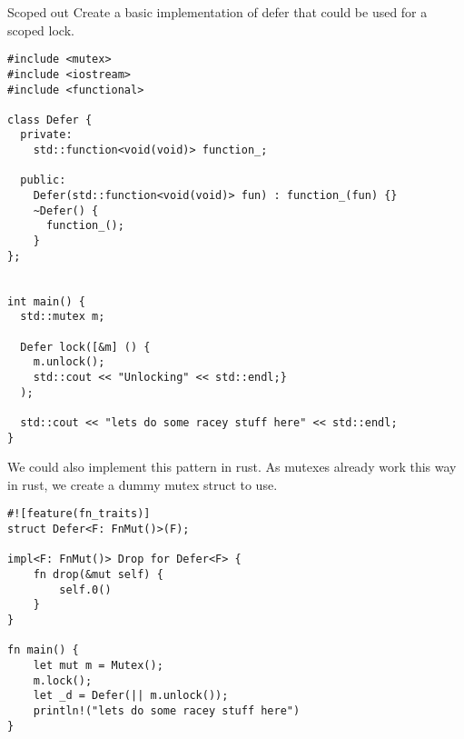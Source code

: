 \begin{examplebox}{Scoped out}
	Create a basic implementation of defer that could be used for a scoped lock.
	\tcblower
	\begin{verbatim}
#include <mutex>
#include <iostream>
#include <functional>

class Defer {
  private:
    std::function<void(void)> function_;

  public:
    Defer(std::function<void(void)> fun) : function_(fun) {}
    ~Defer() {
      function_();
    }
};


int main() {
  std::mutex m;

  Defer lock([&m] () {
    m.unlock();
    std::cout << "Unlocking" << std::endl;}
  );

  std::cout << "lets do some racey stuff here" << std::endl;
}
  \end{verbatim}
	We could also implement this pattern in rust. As mutexes already work this way in rust, we create a dummy mutex struct to use.
	\begin{verbatim}
#![feature(fn_traits)]
struct Defer<F: FnMut()>(F);

impl<F: FnMut()> Drop for Defer<F> {
    fn drop(&mut self) {
        self.0()
    }
}

fn main() {
    let mut m = Mutex();
    m.lock();
    let _d = Defer(|| m.unlock());
    println!("lets do some racey stuff here")
}
  \end{verbatim}
\end{examplebox}

